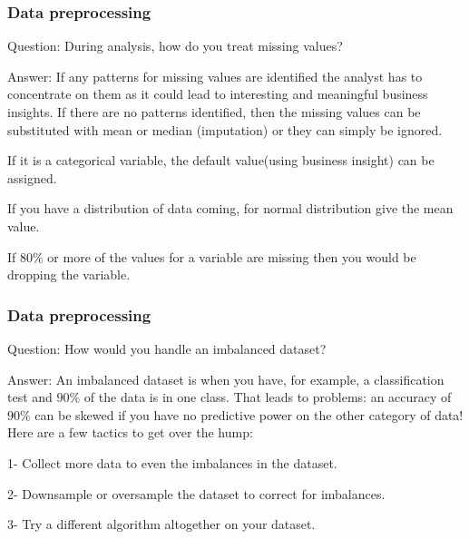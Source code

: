\documentclass[11pt]{beamer}
\begin{document}
\begin{frame}
\frametitle{Data preprocessing}
\begin{block}{Question:}
	During analysis, how do you treat missing values?
\end{block}
\begin{block}{Answer:}
	If any patterns for missing values are identified the analyst has to concentrate on them as it could lead to interesting and meaningful business insights. If there are no patterns identified, then the missing values can be substituted with mean or median (imputation) or they can simply be ignored.
	
	If it is a categorical variable, the default value(using business insight) can be assigned.
	
	If you have a distribution of data coming, for normal distribution give the mean value.
	
	If $80\%$ or more of the values for a variable are missing then you would be dropping the variable.
\end{block}
\end{frame}

\begin{frame}
\frametitle{Data preprocessing}
\begin{block}{Question:}
	How would you handle an imbalanced dataset?
\end{block}
\begin{block}{Answer:}
	An imbalanced dataset is when you have, for example, a classification test and $90\%$ of the data is in one class. That leads to problems: an accuracy of $90\%$ can be skewed if you have no predictive power on the other category of data! Here are a few tactics to get over the hump:
	
	1- Collect more data to even the imbalances in the dataset.
	
	2- Downsample or oversample the dataset to correct for imbalances.
	
	3- Try a different algorithm altogether on your dataset.
\end{block}
\end{frame}
\end{document}
